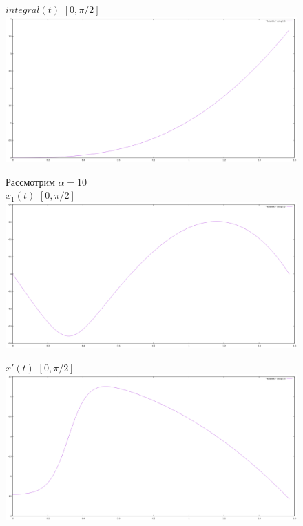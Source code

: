 \documentclass[titlepage]{article}
\begin{document}
\begin{figure}[h!]
$integral(t)$ $[0, \pi/2]$ \\
\centering
\includegraphics[width=1\linewidth]{integral1(t).png} 
\end{figure}
\newpage
\begin{figure}[h!]
Рассмотрим $\alpha = 10$ \\ $x_1(t)$  $[0, \pi/2]$\\
\centering
\includegraphics[width=1\linewidth]{x_110(t).png} 
\end{figure}
\newpage
\begin{figure}[h!]
$x'(t)$ $[0, \pi/2]$\\
\centering
\includegraphics[width=1\linewidth]{x_210(t).png} 
\end{figure}
\end{document}
